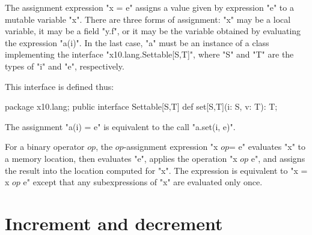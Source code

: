 %

The assignment expression \xcd"x = e" assigns a value given by
expression \xcd"e"
to a mutable variable \xcd"x".  There are three forms of
assignment: \xcd"x" may be a local variable, it may be a field
\xcd"y.f", or it may be the variable obtained by evaluating the expression \xcd"a(i)".
In the last case, \xcd"a" must be an instance of a class implementing the interface
 \xcd"x10.lang.Settable[S,T]", where 
\xcd"S" and \xcd"T" are the types of \xcd"i" and \xcd"e", respectively.

This interface is defined thus:
\begin{xten}
package x10.lang;
public interface Settable[S,T] {
    def set[S,T](i: S, v: T): T;
}
\end{xten}
The assignment \xcd"a(i) = e" is equivalent to the call
\xcd"a.set(i, e)".



For a binary operator
$\mathit{op}$,
the
$\mathit{op}$-assignment expression \xcdmath"x $\mathit{op}$= e"
evaluates \xcd"x" to a memory location, then evaluates \xcd"e",
applies the operation \xcdmath"x $\mathit{op}$ e", and assigns the
result into the location computed for \xcd"x".
The expression is equivalent to \xcdmath"x = x $\mathit{op}$ e"
except that any subexpressions of \xcd"x" are evaluated only
once.


%


\section{Increment and decrement}

